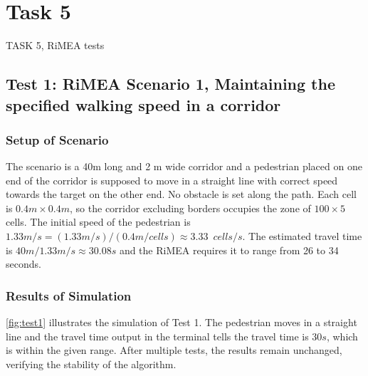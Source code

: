 \documentclass[10pt,a4paper]{article}
\begin{document}
\section{Task 5}

\begin{task}{TASK 5, RiMEA tests}

\subsection{Test 1: RiMEA Scenario 1, Maintaining the specified walking speed in a corridor}

\subsubsection{Setup of Scenario}

The scenario is a 40m long and 2 m wide corridor and a pedestrian placed on one end of the corridor is supposed to move in a straight line with correct speed towards the target on the other end. No obstacle is set along the path. Each cell is $0.4m \times 0.4m$, so the corridor excluding borders occupies the zone of $100 \times 5$ cells. The initial speed of the pedestrian is $1.33m/s = (1.33m/s) / (0.4m/cells) \approx 3.33 \enspace cells/s$. The estimated travel time is $40m / 1.33m/s \approx 30.08s $ and the RiMEA requires it to range from 26 to 34 seconds.

\subsubsection{Results of Simulation}

\autoref{fig:test1} illustrates the simulation of Test 1. The pedestrian moves in a straight line and the travel time output in the terminal tells the travel time is $30s$, which is within the given range. After multiple tests, the results remain unchanged, verifying the stability of the algorithm.


\end{task}
\end{document}
